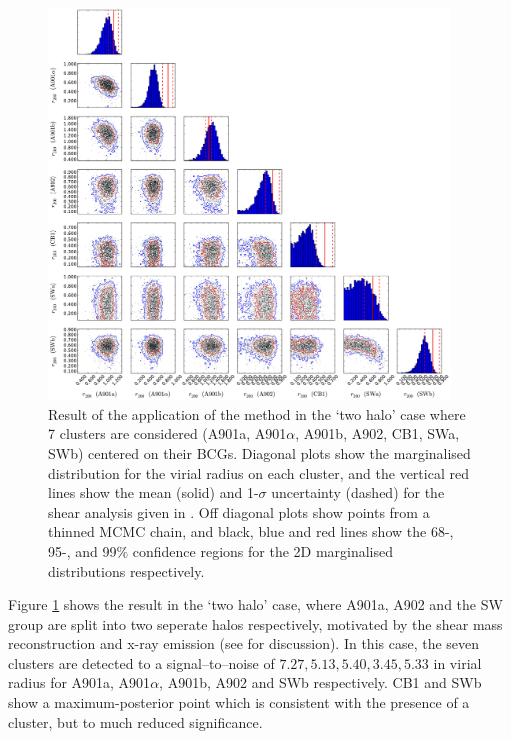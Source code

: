 \documentclass[useAMS,usenatbib,times,letter,amssymb]{mn2e}
\begin{document}
\begin{figure}
\centering
\includegraphics[width = 0.95\textwidth]{Figures/Data/Mass_Reconstruction/MCMC_DistributionPlot_7Cluster_BCG_MassOnly.pdf}
\caption{Result of the application of the method in the `two halo' case where 7 clusters are considered (A901a, A901$\alpha$, A901b,  A902, CB1, SWa, SWb) centered on their BCGs. Diagonal plots show the marginalised distribution for the virial radius on each cluster, and the vertical red lines show the mean (solid) and 1-$\sigma$ uncertainty (dashed) for the shear analysis given in \cite{Heymans:2008p2060}. Off diagonal plots show points from a thinned MCMC chain, and black, blue and red lines show the 68-, 95-, and 99$\%$ confidence regions for the 2D marginalised distributions respectively.} \label{fig:MassRecon_BCG_7Cluster}
\end{figure}

Figure \ref{fig:MassRecon_BCG_7Cluster} shows the result in the `two halo' case, where A901a, A902 and the SW group are split into two seperate halos respectively, motivated by the shear mass reconstruction and x-ray emission (see \cite{Heymans:2008p2060} for discussion). In this case, the seven clusters are detected to a signal--to--noise of $7.27, 5.13, 5.40, 3.45, 5.33$ in virial radius for A901a, A901$\alpha$, A901b, A902 and SWb respectively. CB1 and SWb show a maximum-posterior point which is consistent with the presence of a cluster, but to much reduced significance.
\end{document}
